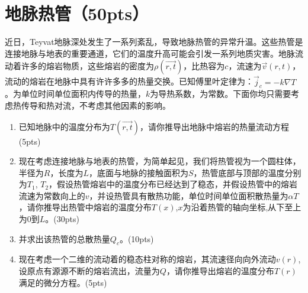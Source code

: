 \section{地脉热管（50pts）}
近日，Teyvat地脉深处发生了一系列紊乱，导致地脉热管的异常升温。这些热管是连接地脉与地表的重要通道，它们的温度升高可能会引发一系列地质灾害。地脉流动着许多的熔岩物质，这些熔岩的密度为\(\rho(\vec{r,t})\)，比热容为\(c\)，流速为\(\vec{v}(r,t)\)，流动的熔岩在地脉中具有许许多多的热量交换。已知傅里叶定律为：\(\vec{j}_c = -k \nabla T\)。为单位时间单位面积内传导的热量，\(k\)为导热系数，为常数。下面你均只需要考虑热传导和热对流，不考虑其他因素的影响。
\begin{enumerate}
	\item 已知地脉中的温度分布为\(T(\vec{r,t})\)，请你推导出地脉中熔岩的热量流动方程(5pts)
	\item 现在考虑连接地脉与地表的热管，为简单起见，我们将热管视为一个圆柱体，半径为\(R\)，长度为\(L\)，底面与地脉的接触面积为\(S\)，热管底部与顶部的温度分别为\(T_1\), \(T_2\)，假设热管熔岩中的温度分布已经达到了稳态，并假设热管中的熔岩流速为常数向上的\(v\)，并设热管具有散热功能，单位时间单位面积散热量为\(\alpha T\)，请你推导出热管中熔岩的温度分布\(T(x)\),\(x\)为沿着热管的轴向坐标,从下至上为\(0\)到\(L\)。(30pts)
	\item 并求出该热管的总散热量\(Q_c\)。(10pts)
	\item 现在考虑一个二维的流动着的稳态柱对称的熔岩，其流速径向向外流动\(v(r)\),设原点有源源不断的熔岩流出，流量为\(Q\)，请你推导出熔岩的温度分布\(T(r)\)满足的微分方程。(5pts)
\end{enumerate}